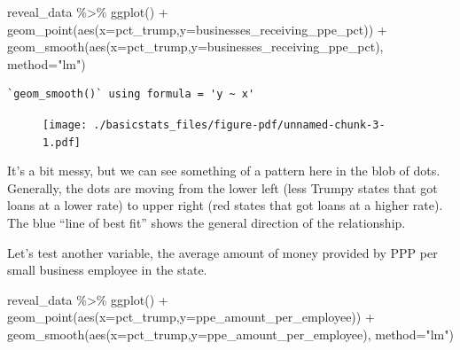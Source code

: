 \documentclass[
  letterpaper,
  DIV=11,
  numbers=noendperiod]{scrreprt}
\newenvironment{Shaded}{\begin{snugshade}}{\end{snugshade}}
\newcommand{\AttributeTok}[1]{\textcolor[rgb]{0.40,0.45,0.13}{#1}}
\newcommand{\FunctionTok}[1]{\textcolor[rgb]{0.28,0.35,0.67}{#1}}
\newcommand{\NormalTok}[1]{\textcolor[rgb]{0.00,0.23,0.31}{#1}}
\newcommand{\SpecialCharTok}[1]{\textcolor[rgb]{0.37,0.37,0.37}{#1}}
\newcommand{\StringTok}[1]{\textcolor[rgb]{0.13,0.47,0.30}{#1}}
\begin{document}
\begin{Shaded}
\begin{Highlighting}[]
\NormalTok{reveal\_data }\SpecialCharTok{\%\textgreater{}\%}
  \FunctionTok{ggplot}\NormalTok{() }\SpecialCharTok{+}
  \FunctionTok{geom\_point}\NormalTok{(}\FunctionTok{aes}\NormalTok{(}\AttributeTok{x=}\NormalTok{pct\_trump,}\AttributeTok{y=}\NormalTok{businesses\_receiving\_ppe\_pct)) }\SpecialCharTok{+}
  \FunctionTok{geom\_smooth}\NormalTok{(}\FunctionTok{aes}\NormalTok{(}\AttributeTok{x=}\NormalTok{pct\_trump,}\AttributeTok{y=}\NormalTok{businesses\_receiving\_ppe\_pct), }\AttributeTok{method=}\StringTok{"lm"}\NormalTok{)}
\end{Highlighting}
\end{Shaded}

\begin{verbatim}
`geom_smooth()` using formula = 'y ~ x'
\end{verbatim}

\begin{figure}[H]

{\centering \texttt{[image: ./basicstats\_files/figure-pdf/unnamed-chunk-3-1.pdf]}

}

\end{figure}

It's a bit messy, but we can see something of a pattern here in the blob
of dots. Generally, the dots are moving from the lower left (less Trumpy
states that got loans at a lower rate) to upper right (red states that
got loans at a higher rate). The blue ``line of best fit'' shows the
general direction of the relationship.

Let's test another variable, the average amount of money provided by PPP
per small business employee in the state.

\begin{Shaded}
\begin{Highlighting}[]
\NormalTok{reveal\_data }\SpecialCharTok{\%\textgreater{}\%}
  \FunctionTok{ggplot}\NormalTok{() }\SpecialCharTok{+}
  \FunctionTok{geom\_point}\NormalTok{(}\FunctionTok{aes}\NormalTok{(}\AttributeTok{x=}\NormalTok{pct\_trump,}\AttributeTok{y=}\NormalTok{ppe\_amount\_per\_employee)) }\SpecialCharTok{+}
  \FunctionTok{geom\_smooth}\NormalTok{(}\FunctionTok{aes}\NormalTok{(}\AttributeTok{x=}\NormalTok{pct\_trump,}\AttributeTok{y=}\NormalTok{ppe\_amount\_per\_employee), }\AttributeTok{method=}\StringTok{"lm"}\NormalTok{)}
\end{Highlighting}
\end{Shaded}
\end{document}
